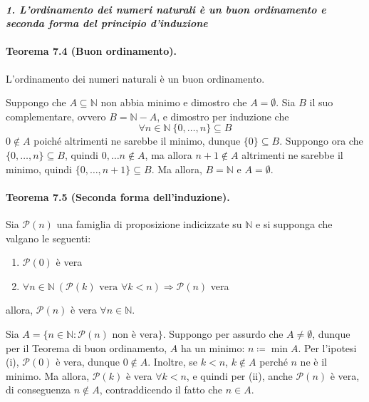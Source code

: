 \documentclass[12pt, a4paper]{report}
\theoremstyle{definition}
\newcommand{\N}{\mathbb{N}}
\begin{document}
\paragraph{\emph{1. L’ordinamento dei numeri naturali è un buon ordinamento e seconda
forma del principio d'induzione}}
\paragraph{Teorema 7.4 (Buon ordinamento).}
L'ordinamento dei numeri naturali è un buon ordinamento.

\begin{demonstration}
    Suppongo che $A\subseteq\N$ non abbia minimo e dimostro che $A=\emptyset$.
    Sia $B$ il suo complementare, ovvero $B=\N-A$, e dimostro per induzione che
    \[\forall n\in\N\ \{0,\dots,n\}\subseteq B\]
    $0\notin A$ poiché altrimenti ne sarebbe il minimo, dunque $\{0\}
    \subseteq B$. Suppongo ora che $\{0,\dots,n\}\subseteq B$, quindi $0,\dots n
    \notin A$, ma allora $n+1\notin A$ altrimenti ne sarebbe il minimo, quindi
    $\{0,\dots,n+1\}\subseteq B$. Ma allora, $B=\N$ e $A=\emptyset$.
\end{demonstration}

\paragraph{Teorema 7.5 (Seconda forma dell'induzione).}
Sia $\mathcal{P}(n)$ una famiglia di proposizione indicizzate su $\N$ e si
supponga che valgano le seguenti:
\begin{enumerate}[label=(\roman*)]
    \item $\mathcal{P}(0)$ è vera
    \item $\forall n\in\N\ (\mathcal{P}(k)\text{ vera }\forall k<n)\Rightarrow
    \mathcal{P}(n)$ vera
\end{enumerate}
allora, $\mathcal{P}(n)$ è vera $\forall n\in\N$.

\begin{demonstration}
    Sia $A=\{n\in\N:\mathcal{P}(n)\text{ non è vera}\}$. Suppongo per assurdo
    che $A\neq\emptyset$, dunque per il Teorema di buon ordinamento, $A$ ha un
    minimo: $n\coloneqq\min{A}$. Per l'ipotesi (i), $\mathcal{P}(0)$ è vera,
    dunque $0\notin A$. Inoltre, se $k<n$, $k\notin A$ perché $n$ ne è il minimo.
    Ma allora, $\mathcal{P}(k)$ è vera $\forall k<n$, e quindi per (ii), anche
    $\mathcal{P}(n)$ è vera, di conseguenza $n\notin A$, contraddicendo il fatto
    che $n\in A$.
\end{demonstration}
\end{document}
